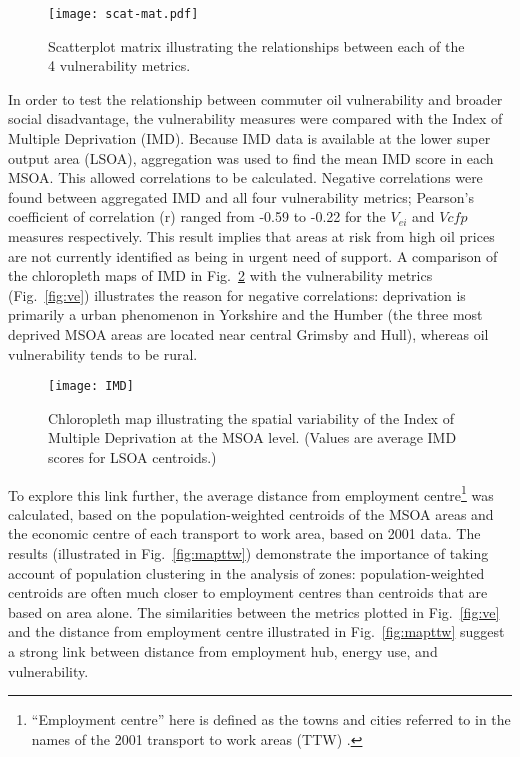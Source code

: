 \begin{figure}[t]
 \centering
\texttt{[image: scat-mat.pdf]}
 \caption[Scatterplot matrix of vulnerability metrics]
 {Scatterplot matrix illustrating the relationships between each of
the 4 vulnerability metrics.}
 \label{fig:scat-mat}
\end{figure}

In order to test the relationship between commuter oil vulnerability and
broader social disadvantage, the vulnerability measures were compared
with the Index of Multiple Deprivation (IMD). Because IMD data is available
at the lower super output area (LSOA), aggregation was used to find the mean
IMD score in each MSOA. This allowed correlations to be calculated.
Negative correlations were found between aggregated IMD and
all four vulnerability metrics;
Pearson's coefficient of correlation
(r) ranged from -0.59 to -0.22
for the $V_{ei}$ and $V{cfp}$ measures respectively.
This result implies that
areas at risk from high oil prices are not currently identified as
being in urgent need of support. A comparison of the chloropleth maps
of IMD in Fig.~\ref{fig:IMD} with the vulnerability metrics
(Fig.~\ref{fig:ve}) illustrates the reason
for negative correlations: deprivation is primarily a urban phenomenon in
Yorkshire and the Humber (the three most deprived MSOA areas
are located near central Grimsby and Hull),
whereas oil vulnerability tends to be rural.

\begin{figure}[t]
 \centering
\texttt{[image: IMD]}
 \caption[Chloropleth map of deprivation in Yorkshire and the Humber]
 {Chloropleth map illustrating the spatial variability of
the Index of Multiple Deprivation at the MSOA level. (Values are
average IMD scores for LSOA centroids.)}
 \label{fig:IMD}
\end{figure}

To explore this link further, the average distance from employment
centre\footnote{``Employment centre'' here is defined as the towns and cities
referred to in the names of the 2001 transport to work areas (TTW)
\citep{ONS2011-ttw}.} was calculated, based on the population-weighted centroids
of the MSOA areas and the economic centre of each transport to work area, based
on 2001 data. The results (illustrated in Fig.~\ref{fig:mapttw}) demonstrate
the importance of taking account of population clustering in the analysis of
zones: population-weighted centroids are often much closer to employment
centres than centroids that are based on area alone.
The similarities between
the metrics plotted in Fig.~\ref{fig:ve}
and the distance from employment centre illustrated in Fig.~\ref{fig:mapttw}
suggest a strong link between distance from employment hub, energy use, and
vulnerability.

